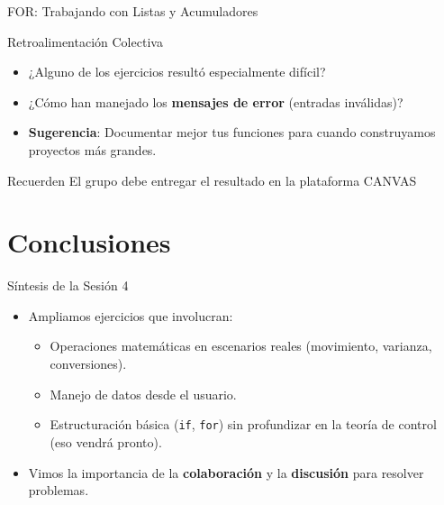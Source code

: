 \documentclass[10pt]{beamer}
\begin{document}
\begin{frame}[fragile]{FOR: Trabajando con Listas y Acumuladores}
\begin{frame}{Retroalimentación Colectiva}
  \begin{itemize}
    \item ¿Alguno de los ejercicios resultó especialmente difícil?
    \item ¿Cómo han manejado los \textbf{mensajes de error} (entradas inválidas)?
    \item \textbf{Sugerencia}: Documentar mejor tus funciones para cuando construyamos proyectos más grandes.
  \end{itemize}
  \begin{block}{Recuerden}
    El grupo debe entregar el resultado en la plataforma CANVAS
  \end{block}
\end{frame}

\section{Conclusiones}

\begin{frame}{Síntesis de la Sesión 4}
  \begin{itemize}
    \item Ampliamos ejercicios que involucran:
      \begin{itemize}
        \item Operaciones matemáticas en escenarios reales (movimiento, varianza, conversiones).
        \item Manejo de datos desde el usuario.
        \item Estructuración básica (\texttt{if}, \texttt{for}) sin profundizar en la teoría de control (eso vendrá pronto).
      \end{itemize}
    \item Vimos la importancia de la \textbf{colaboración} y la \textbf{discusión} para resolver problemas.
  \end{itemize}
\end{frame}


\end{frame}
\end{document}
